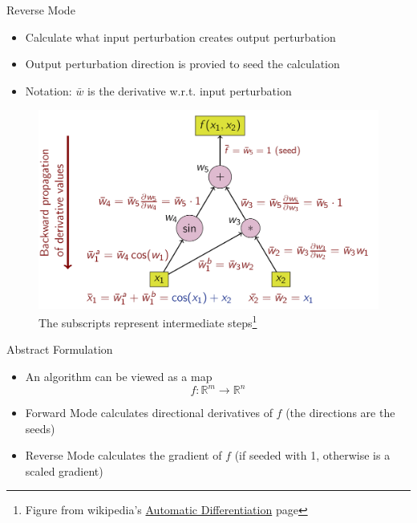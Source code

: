 \documentclass[12pt]{beamer}
\newcommand{\fn}[1]{\footnote{\footnotesize #1}}
\begin{document}
  \begin{frame}{Reverse Mode}
    \begin{itemize}
      \item Calculate what input perturbation creates output perturbation
      \item Output perturbation direction is provied to seed the calculation
      \item Notation: $\bar{w}$ is the derivative w.r.t. input perturbation
    \end{itemize}

    \begin{figure}[h!]
      \centering
      \includegraphics[height=.5\textheight]{reverseMode}
      \caption{The subscripts represent intermediate steps\fn{Figure from wikipedia's \href{http://en.wikipedia.org/wiki/Automatic_differentiation}{Automatic Differentiation} page}}
    \end{figure}
  \end{frame}

  \begin{frame}{Abstract Formulation}
    \begin{itemize}
      \item An algorithm can be viewed as a map
        \[f:\mathbb{R}^m \to \mathbb{R}^n\]
      \item Forward Mode calculates directional derivatives of $f$ (the directions are the seeds)
      \item Reverse Mode calculates the gradient of $f$ (if seeded with 1, otherwise is a scaled gradient)
    \end{itemize}

  \end{frame}
\end{document}
